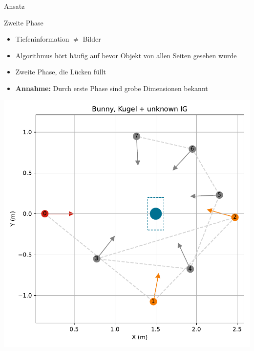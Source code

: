 \documentclass{beamer}
\begin{document}
\begin{frame}{Ansatz}
	\begin{minipage}{0.59\textwidth}
		\begin{block}{Zweite Phase}
			\begin{itemize}
				\item Tiefeninformation $\neq$ Bilder
				\item Algorithmus hört häufig auf bevor Objekt von allen Seiten gesehen wurde
				\item Zweite Phase, die Lücken füllt
				\item \textbf{Annahme:} Durch erste Phase sind grobe Dimensionen bekannt
			\end{itemize}
		\end{block}
	\end{minipage}
	\begin{minipage}{0.4\textwidth}
		\centering
		\includegraphics[width=1\textwidth]{Graphics/bunny_sphere_unknown_views.pdf}
	\end{minipage}
\end{frame}
\end{document}
